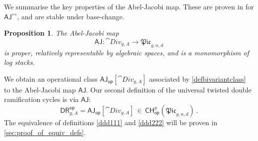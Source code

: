 \documentclass[a4paper,12pt]{article} %
\newcommand{\ca}[1]{{\mathcal{#1}}}
\theoremstyle{definition}
\theoremstyle{plain}%
\newtheorem{proposition}[definition]{Proposition}
\newcommand{\aj}{{\scriptstyle \mathsf{AJ}}}
\newcommand{\Picabs}{\mathfrak{Pic}}
\newcommand{\jocomment}[1]{}
\newcommand{\DRop}{\mathsf{DR}^{\mathsf{op}}}
\begin{document}


We summarise the key properties of the Abel-Jacobi map. These are proven
in \cite{Marcus2017Logarithmic-com} for $\aj^{\rel}$, and are stable under base-change. 
\begin{proposition}
The Abel-Jacobi map 
$$\aj\colon \cat{Div}_{g,A} \to \Picabs_{g,n,d}$$
is proper, relatively representable by algebraic spaces, and is a monomorphism of log stacks. 
\end{proposition}


We obtain an operational class $\aj_{\mathsf{op}}[\cat{Div}_{g,A}]$ associated by \cref{defbivariantclass} to the Abel-Jacobi map $\aj$.
Our second definition of the universal twisted double ramification
cycles is via $\aj$:
\begin{equation}\label{ddd222}
\DRop_{g,A} = \aj_{\mathsf{op}}[\cat{Div}_{g,A}] \, \in\, 
\mathsf{CH}^g_{\mathsf{op}}(\Picabs_{g,n,d})
\, . 
\end{equation}
The equivalence of 
definitions \eqref{ddd111} and \eqref{ddd222} will be proven in \cref{sec:proof_of_equiv_defs}.


\end{document}
